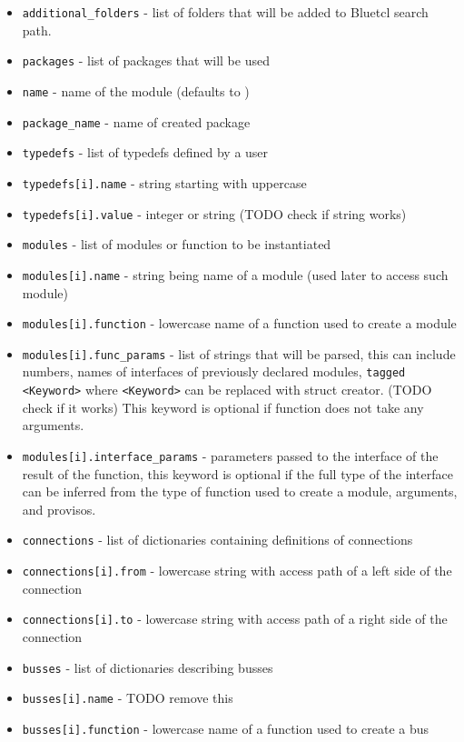 \documentclass[12pt]{report}
\begin{document}
\begin{itemize} 
   \item \verb!additional_folders! - list of folders that will be added to Bluetcl search path. 
   \item \verb!packages! - list of packages that will be used 
   \item \verb!name! - name of the module (defaults to ) 
   \item \verb!package_name! - name of created package 
   \item \verb!typedefs! - list of typedefs defined by a user 
   \item \verb!typedefs[i].name! - string starting with uppercase 
   \item \verb!typedefs[i].value! - integer or string (TODO check if string works) 
   \item \verb!modules! - list of modules or function to be instantiated 
   \item \verb!modules[i].name! - string being name of a module (used later to access such module) 
   \item \verb!modules[i].function! - lowercase name of a function used to create a module 
   \item \verb!modules[i].func_params! - list of strings that will be parsed, this can include numbers, names of interfaces of previously declared modules, \verb!tagged <Keyword>! where \verb!<Keyword>! can be replaced with struct creator. (TODO check if it works) This keyword is optional if function does not take any arguments. 
   \item \verb!modules[i].interface_params! - parameters passed to the interface of the result of the function, this keyword is optional if the full type of the interface can be inferred from the type of function used to create a module, arguments, and provisos. 
   \item \verb!connections! - list of dictionaries containing definitions of connections 
   \item \verb!connections[i].from! - lowercase string with access path of a left side of the connection 
   \item \verb!connections[i].to! - lowercase string with access path of a right side of the connection  
   \item \verb!busses! - list of dictionaries describing busses 
   \item \verb!busses[i].name! - TODO remove this 
   \item \verb!busses[i].function! - lowercase name of a function used to create a bus 

\end{itemize}
\end{document}
